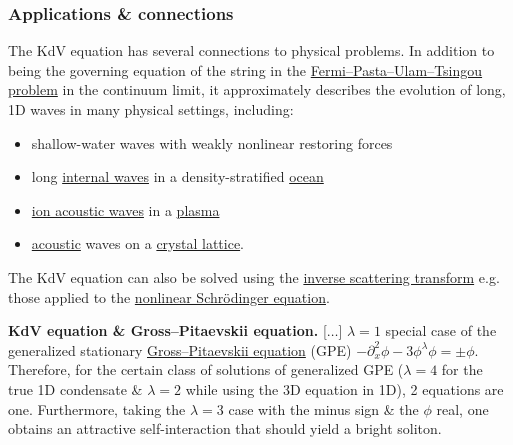 \documentclass{article}
\begin{document}
\subsubsection{Applications \& connections}
The KdV equation has several connections to physical problems. In addition to being the governing equation of the string in the \href{https://en.wikipedia.org/wiki/Fermi%E2%80%93Pasta%E2%80%93Ulam%E2%80%93Tsingou_problem}{Fermi--Pasta--Ulam--Tsingou problem} in the continuum limit, it approximately describes the evolution of long, 1D waves in many physical settings, including:
\begin{itemize}
	\item shallow-water waves with weakly nonlinear restoring forces
	\item long \href{https://en.wikipedia.org/wiki/Internal_wave}{internal waves} in a density-stratified \href{https://en.wikipedia.org/wiki/Ocean}{ocean}
	\item \href{https://en.wikipedia.org/wiki/Ion_acoustic_wave}{ion acoustic waves} in a \href{https://en.wikipedia.org/wiki/Plasma_(physics)}{plasma}
	\item \href{https://en.wikipedia.org/wiki/Acoustics}{acoustic} waves on a \href{https://en.wikipedia.org/wiki/Crystal_lattice}{crystal lattice}.
\end{itemize}
The KdV equation can also be solved using the \href{https://en.wikipedia.org/wiki/Inverse_scattering_transform}{inverse scattering transform} e.g. those applied to the \href{https://en.wikipedia.org/wiki/Non-linear_Schr%C3%B6dinger_equation}{nonlinear Schr\"odinger equation}.

{\bf KdV equation \& Gross--Pitaevskii equation.} [$\ldots$] $\lambda = 1$ special case of the generalized stationary \href{https://en.wikipedia.org/wiki/Gross%E2%80%93Pitaevskii_equation}{Gross--Pitaevskii equation} (GPE) $-\partial_x^2\phi - 3\phi^\lambda\phi = \pm\phi$. Therefore, for the certain class of solutions of generalized GPE ($\lambda = 4$ for the true 1D condensate \& $\lambda = 2$ while using the 3D equation in 1D), 2 equations are one. Furthermore, taking the $\lambda = 3$ case with the minus sign \& the $\phi$ real, one obtains an attractive self-interaction that should yield a bright soliton.
\end{document}
